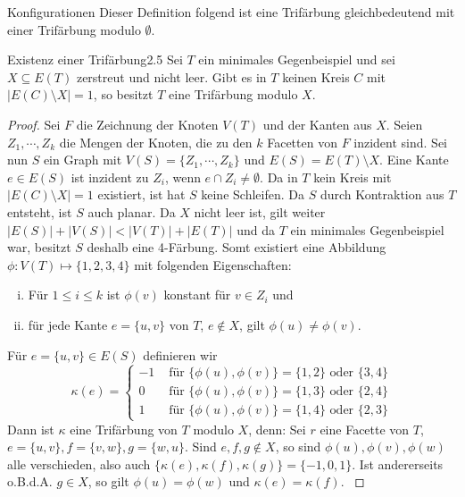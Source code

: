 \begin{section}{Konfigurationen}
 Dieser Definition folgend ist eine Trifärbung gleichbedeutend mit einer Trifärbung modulo $\emptyset$. 
 
 \begin{satzl}{Existenz einer Trifärbung}{2.5}
  Sei $T$ ein minimales Gegenbeispiel und sei $X\subseteq E(T)$ zerstreut und nicht leer. Gibt es in $T$ keinen Kreis $C$ mit $|E(C) \setminus X| = 1$, so besitzt $T$ eine Trifärbung modulo $X$.
 \end{satzl}
 \begin{proof}
  Sei $F$ die Zeichnung der Knoten $V(T)$ und der Kanten aus $X$. Seien $Z_1,\cdots,Z_k$ die Mengen der Knoten, die zu den $k$ Facetten von $F$ inzident sind. Sei nun $S$ ein Graph mit $V(S) =\{Z_1,\cdots,Z_k\}$ und $E(S) = E(T) \setminus X$. Eine Kante $e \in E(S)$ ist inzident zu  $Z_i$, wenn $e \cap Z_i \neq \emptyset$. Da in $T$ kein Kreis mit $|E(C) \setminus X| = 1$ existiert, ist hat $S$ keine Schleifen. Da $S$ durch Kontraktion aus $T$ entsteht, ist $S$ auch planar. Da $X$ nicht leer ist, gilt weiter $|E(S)| + |V(S)| < |V(T)| + |E(T)|$ und da $T$ ein minimales Gegenbeispiel war, besitzt $S$ deshalb eine 4-Färbung. Somt existiert eine Abbildung $\phi: V(T) \mapsto \{1,2,3,4\}$ mit folgenden Eigenschaften:
  \begin{enumerate}[(i)]
   \item Für $1 \leq i \leq k$ ist $\phi(v)$ konstant für $v \in Z_i$ und
   \item für jede Kante $e=\{u,v\}$ von $T$, $e\not\in X$, gilt $\phi(u) \neq \phi(v)$.
  \end{enumerate}
  Für $e=\{u,v\} \in E(S)$ definieren wir\\
  \[\kappa(e) = \begin{cases}
                -1 &\text{ für } \{\phi(u), \phi(v)\} = \{1,2\}\text{ oder } \{3,4\}\\
                0  &\text{ für } \{\phi(u), \phi(v)\} = \{1,3\}\text{ oder } \{2,4\}\\
                1  &\text{ für } \{\phi(u), \phi(v)\} = \{1,4\}\text{ oder } \{2,3\}  
               \end{cases}\]
  Dann ist $\kappa$ eine Trifärbung von $T$ modulo $X$, denn: Sei $r$ eine Facette von $T$, $e=\{u,v\},f=\{v,w\},g=\{w,u\}$. Sind $e,f,g \not\in X$, so sind $\phi(u),\phi(v),\phi(w)$ alle verschieden, also auch $\{\kappa(e),\kappa(f),\kappa(g)\}=\{-1,0,1\}$. Ist andererseits o.B.d.A. $g\in X$, so gilt $\phi(u) = \phi(w)$ und $\kappa(e)=\kappa(f)$. \cite{FourRSST}
 \end{proof}
\end{section}